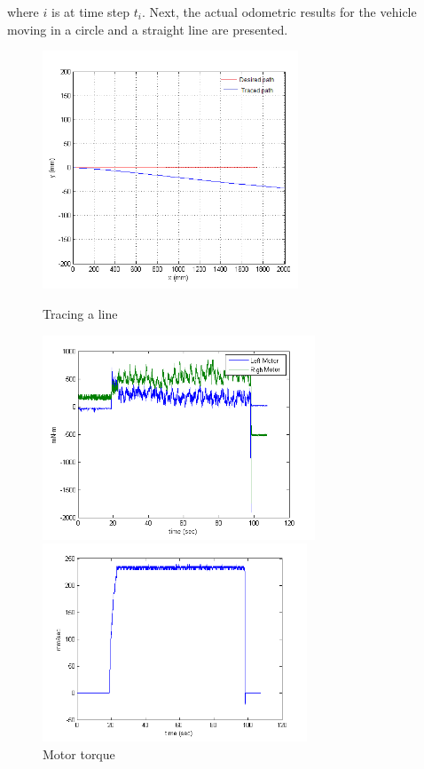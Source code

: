 where $i$ is at time step $t_i$. Next,  the actual odometric results for the vehicle moving in a circle and a straight line are presented.
\begin{figure}
	\begin{minipage}[t]{0.5\textwidth}
		\centering
		\includegraphics[width=3.0in]{Chapter5/fig/Line} 
		\caption{Tracing a line}\label{fig:line}
	\end{minipage}
	\hfill
	\begin{minipage}[t]{0.5\textwidth}
		\centering
		\includegraphics[width=3.2in]{Chapter5/fig/linTorq} 
		\caption{Motor torque}\label{fig:linTorq}
	\end{minipage}
	\begin{minipage}[t]{0.5\textwidth}
		\centering
		\includegraphics[width=3.1in]{Chapter5/fig/linVel} 

\end{minipage}
\end{figure}
